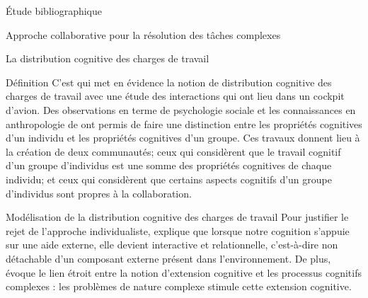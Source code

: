 \documentclass[myfrancais,ngerman,english,french]{mythesis}
\begin{document}
\begin{mychapter}{Étude bibliographique}
\begin{mysection}{Approche collaborative pour la résolution des tâches complexes}
\begin{mysubsection}{La distribution cognitive des charges de travail}
\begin{mysubsubsection}{Définition}
					C'est  qui met en évidence la notion de distribution cognitive des charges de travail avec une étude des interactions qui ont lieu dans un cockpit d'avion.
					Des observations en terme de psychologie sociale et les connaissances en anthropologie de  ont permis de faire une distinction entre les propriétés cognitives d'un individu et les propriétés cognitives d'un groupe.
					Ces travaux donnent lieu à la création de deux communautés; ceux qui considèrent que le travail cognitif d'un groupe d'individus est une somme des propriétés cognitives de chaque individu; et ceux qui considèrent que certains aspects cognitifs d'un groupe d'individus sont propres à la collaboration.
				\end{mysubsubsection}
				\begin{mysubsubsection}{Modélisation de la distribution cognitive des charges de travail}
					Pour justifier le rejet de l'approche individualiste,  explique que lorsque notre cognition s'appuie sur une aide externe, elle devient interactive et relationnelle, c'est-à-dire non détachable d'un composant externe présent dans l'environnement.
					De plus,  évoque le lien étroit entre la notion d'extension cognitive et les processus cognitifs complexes : les problèmes de nature complexe stimule cette extension cognitive.


\end{mysubsubsection}
\end{mysubsection}
\end{mysection}
\end{mychapter}
\end{document}
